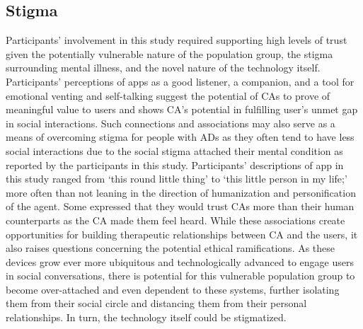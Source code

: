     \subsection{Stigma}
        Participants' involvement in this study required supporting high levels of trust given the potentially vulnerable nature of the population group, the stigma surrounding mental illness, and the novel nature of the technology itself. Participants' perceptions of \acp{app} as a good listener, a companion, and a tool for emotional venting and self-talking suggest the potential of \ac{CA}s to prove of meaningful value to users and shows \ac{CA}'s potential in fulfilling user's unmet gap in social interactions. Such connections and associations may also serve as a means of overcoming stigma for people with \ac{AD}s as they often tend to have less social interactions due to the social stigma attached their mental condition as reported by the participants in this study. Participants' descriptions of \acl{app} in this study ranged from `this round little thing' to `this little person in my life;' more often than not leaning in the direction of humanization and personification of the agent. Some expressed that they would trust \ac{CA}s more than their human counterparts as the \ac{CA} made them feel heard. While these associations create opportunities for building therapeutic relationships between \ac{CA} and the users, it also raises questions concerning the potential ethical ramifications. As these devices grow ever more ubiquitous and technologically advanced to engage users in social conversations, there is potential for this vulnerable population group to become over-attached and even dependent to these systems, further isolating them from their social circle and distancing them from their personal relationships. In turn, the technology itself could be stigmatized. 
        
        

    
        
